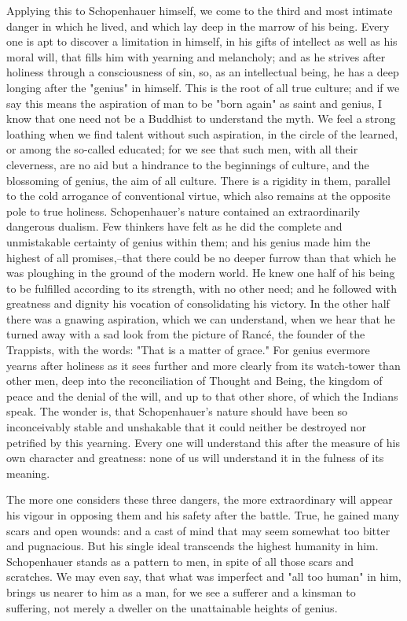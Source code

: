 Applying this to Schopenhauer himself, we come to the third and most
intimate danger in which he lived, and which lay deep in the marrow
of his being. Every one is apt to discover a limitation in himself,
in his gifts of intellect as well as his moral will, that fills him
with yearning and melancholy; and as he strives after holiness
through a consciousness of sin, so, as an intellectual being, he has
a deep longing after the "genius" in himself. This is the root of all
true culture; and if we say this means the aspiration of man to be
"born again" as saint and genius, I know that one need not be a
Buddhist to understand the myth. We feel a strong loathing when we
find talent without such aspiration, in the circle of the learned, or
among the so-called educated; for we see that such men, with all
their cleverness, are no aid but a hindrance to the beginnings of
culture, and the blossoming of genius, the aim of all culture. There
is a rigidity in them, parallel to the cold arrogance of conventional
virtue, which also remains at the opposite pole to true holiness.
Schopenhauer's nature contained an extraordinarily dangerous dualism.
Few thinkers have felt as he did the complete and unmistakable
certainty of genius within them; and his genius made him the highest
of all promises,--that there could be no deeper furrow than that
which he was ploughing in the ground of the modern world. He knew one
half of his being to be fulfilled according to its strength, with no
other need; and he followed with greatness and dignity his vocation
of consolidating his victory. In the other half there was a gnawing
aspiration, which we can understand, when we hear that he turned away
with a sad look from the picture of Rancé, the founder of the
Trappists, with the words: "That is a matter of grace." For genius
evermore yearns after holiness as it sees further and more clearly
from its watch-tower than other men, deep into the reconciliation of
Thought and Being, the kingdom of peace and the denial of the will,
and up to that other shore, of which the Indians speak. The wonder
is, that Schopenhauer's nature should have been so inconceivably
stable and unshakable that it could neither be destroyed nor
petrified by this yearning. Every one will understand this after the
measure of his own character and greatness: none of us will
understand it in the fulness of its meaning.

The more one considers these three dangers, the more extraordinary
will appear his vigour in opposing them and his safety after the
battle. True, he gained many scars and open wounds: and a cast of
mind that may seem somewhat too bitter and pugnacious. But his single
ideal transcends the highest humanity in him. Schopenhauer stands as
a pattern to men, in spite of all those scars and scratches. We may
even say, that what was imperfect and "all too human" in him, brings
us nearer to him as a man, for we see a sufferer and a kinsman to
suffering, not merely a dweller on the unattainable heights of
genius.

